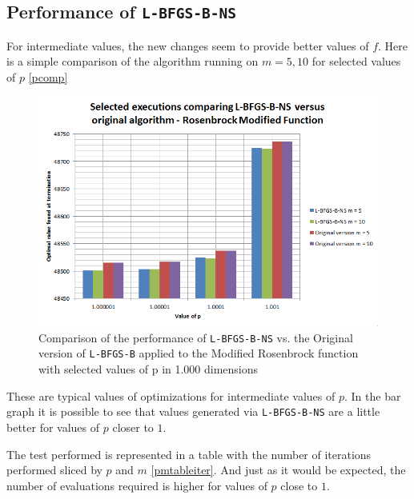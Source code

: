 \subsection{Performance of \texttt{L-BFGS-B-NS}}

For intermediate values, the new changes seem to provide better values of $f$. Here is a simple comparison of the algorithm running on $m = 5,10$ for selected values of $p$ \eqref{pcomp}

\begin{figure}
\begin{center}
\includegraphics[scale=0.75]{Figures/ComparisonNewOld.PNG}
\caption[Comparison of selected values of the Modified Rosenbrock function]{Comparison of the performance of \texttt{L-BFGS-B-NS} vs. the Original version of \texttt{L-BFGS-B} applied to the Modified Rosenbrock function with selected values of p in 1.000 dimensions}
\label{pcomp}
\end{center}
\end{figure}

These are typical values of optimizations for intermediate values of $p$. In the bar graph it is possible to see that values generated via \texttt{L-BFGS-B-NS} are a little better for values of $p$ closer to $1$. 

The test performed is represented in a table with the number of iterations performed sliced by $p$ and $m$ \eqref{pmtableiter}. And just as it would be expected, the number of evaluations required is higher for values of $p$ close to $1$.

